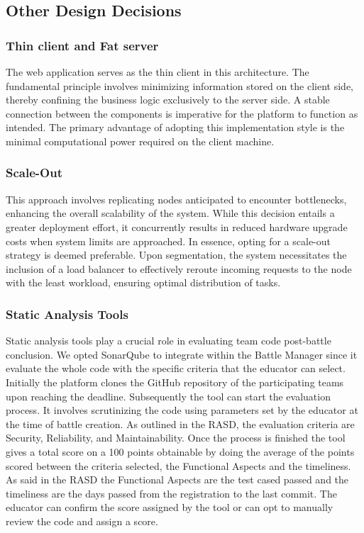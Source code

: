 \documentclass[12pt,oneside,a4paper]{article}
\begin{document}
\clearpage

\subsection{Other Design Decisions}

\subsubsection{Thin client and Fat server}
The web application serves as the thin client in this architecture. The fundamental principle involves minimizing information stored on the client side, thereby confining the business logic exclusively to the server side. A stable connection between the components is imperative for the platform to function as intended. The primary advantage of adopting this implementation style is the minimal computational power required on the client machine.

\subsubsection{Scale-Out}
This approach involves replicating nodes anticipated to encounter bottlenecks, enhancing the overall scalability of the system. While this decision entails a greater deployment effort, it concurrently results in reduced hardware upgrade costs when system limits are approached. In essence, opting for a scale-out strategy is deemed preferable.
Upon segmentation, the system necessitates the inclusion of a load balancer to effectively reroute incoming requests to the node with the least workload, ensuring optimal distribution of tasks.

\subsubsection{Static Analysis Tools}
Static analysis tools play a crucial role in evaluating team code post-battle conclusion. We opted SonarQube to integrate within the Battle Manager since it evaluate the whole code with the specific criteria that the educator can select. Initially the platform clones the GitHub repository of the participating teams upon reaching the deadline. Subsequently the tool can start the evaluation process. It involves scrutinizing the code using parameters set by the educator at the time of battle creation. As outlined in the RASD, the evaluation criteria are Security, Reliability, and Maintainability. Once the process is finished the tool gives a total score on a 100 points obtainable by doing the average of the points scored between the criteria selected, the Functional Aspects and the timeliness. As said in the RASD the Functional Aspects are the test cased passed and the timeliness are the days passed from the registration to the last commit. The educator can confirm the score assigned by the tool or can opt to manually review the code and assign a score.
\end{document}
